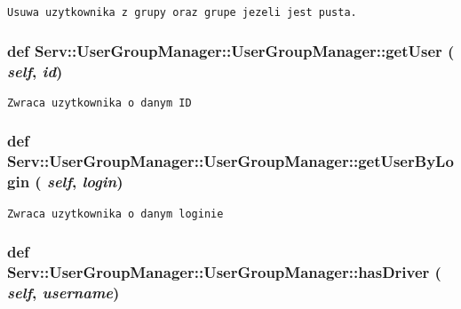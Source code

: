 \footnotesize\begin{verbatim}Usuwa uzytkownika z grupy oraz grupe jezeli jest pusta.

\end{verbatim}
\normalsize
 \hypertarget{class_serv_1_1_user_group_manager_1_1_user_group_manager_94bccb5702d504f5b782ba2379aaaab4}{
\subsubsection[{getUser}]{\setlength{\rightskip}{0pt plus 5cm}def Serv::UserGroupManager::UserGroupManager::getUser ( {\em self}, \/   {\em id})}}
\label{class_serv_1_1_user_group_manager_1_1_user_group_manager_94bccb5702d504f5b782ba2379aaaab4}




\footnotesize\begin{verbatim}Zwraca uzytkownika o danym ID

\end{verbatim}
\normalsize
 \hypertarget{class_serv_1_1_user_group_manager_1_1_user_group_manager_ed20d08470748f78a641e6cc5700b505}{
\subsubsection[{getUserByLogin}]{\setlength{\rightskip}{0pt plus 5cm}def Serv::UserGroupManager::UserGroupManager::getUserByLogin ( {\em self}, \/   {\em login})}}
\label{class_serv_1_1_user_group_manager_1_1_user_group_manager_ed20d08470748f78a641e6cc5700b505}




\footnotesize\begin{verbatim}Zwraca uzytkownika o danym loginie

\end{verbatim}
\normalsize
 \hypertarget{class_serv_1_1_user_group_manager_1_1_user_group_manager_39ae7245da0bcda25ce712d1b55f2f29}{
\subsubsection[{hasDriver}]{\setlength{\rightskip}{0pt plus 5cm}def Serv::UserGroupManager::UserGroupManager::hasDriver ( {\em self}, \/   {\em username})}}
\label{class_serv_1_1_user_group_manager_1_1_user_group_manager_39ae7245da0bcda25ce712d1b55f2f29}




